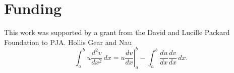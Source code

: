 \section{Funding}
\label{funding} 
This work was supported by a grant from the David and Lucille Packard Foundation to PJA. Hollis Gear and Nau
\begin{equation}
\label{eqn:drag}
	\int_a^bu\frac{d^2v}{dx^2}\,dx
	=\left.u\frac{dv}{dx}\right|_a^b
	-\int_a^b\frac{du}{dx}\frac{dv}{dx}\,dx.
\end{equation}
